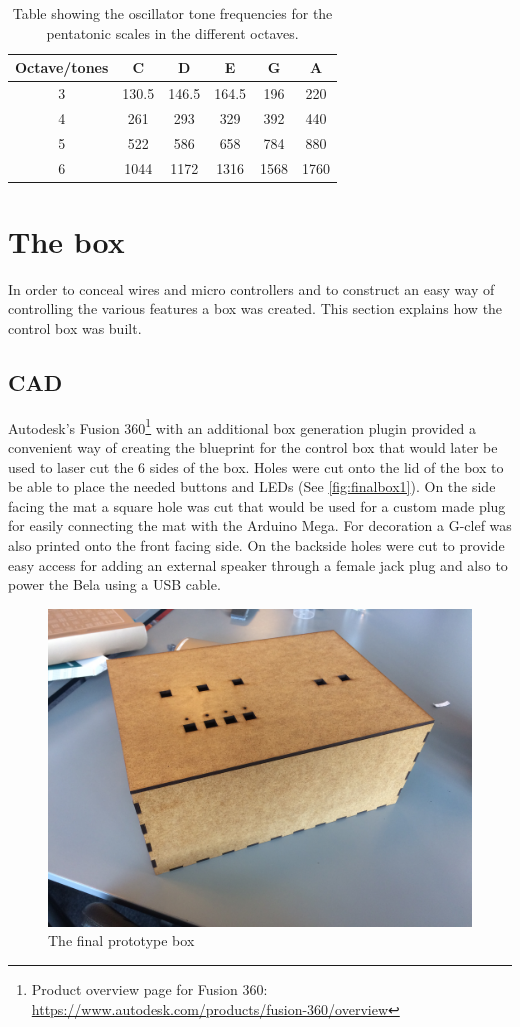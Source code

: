 	\begin{table}[H]
		\centering
		\caption{Table showing the oscillator tone frequencies for the pentatonic scales in the different octaves.}
		\label{tab:toneFreq}
		\begin{tabular}{|c|c|c|c|c|c|}
			\hline
			Octave/tones & C     & D     & E     & G    & A    \\ \hline
			3            & 130.5 & 146.5 & 164.5 & 196  & 220  \\ \hline
			4            & 261   & 293   & 329   & 392  & 440  \\ \hline
			5            & 522   & 586   & 658   & 784  & 880  \\ \hline
			6            & 1044  & 1172  & 1316  & 1568 & 1760 \\ \hline
		\end{tabular}
	\end{table}
	



\section{The box}%
In order to conceal wires and micro controllers and to construct an easy way of controlling the various features a box was created. This section explains how the control box was built.

	\subsection{CAD}
	Autodesk's Fusion 360\footnote{Product overview page for Fusion 360: \url{https://www.autodesk.com/products/fusion-360/overview}} with an additional box generation plugin provided a convenient way of creating the blueprint for the control box that would later be used to laser cut the 6 sides of the box. Holes were cut onto the lid of the box to be able to place the needed buttons and LEDs (See \autoref{fig:finalbox1}). On the side facing the mat a square hole was cut that would be used for a custom made plug for easily connecting the mat with the Arduino Mega. For decoration a G-clef was also printed onto the front facing side. On the backside holes were cut to provide easy access for adding an external speaker through a female jack plug and also to power the Bela using a USB cable.
	
	
	\begin{figure}[H]
		\centering
		\includegraphics[width=0.7\linewidth]{figure/Design/finalbox1}
		\caption{The final prototype box}	
		\label{fig:finalbox1}
	\end{figure}
	
